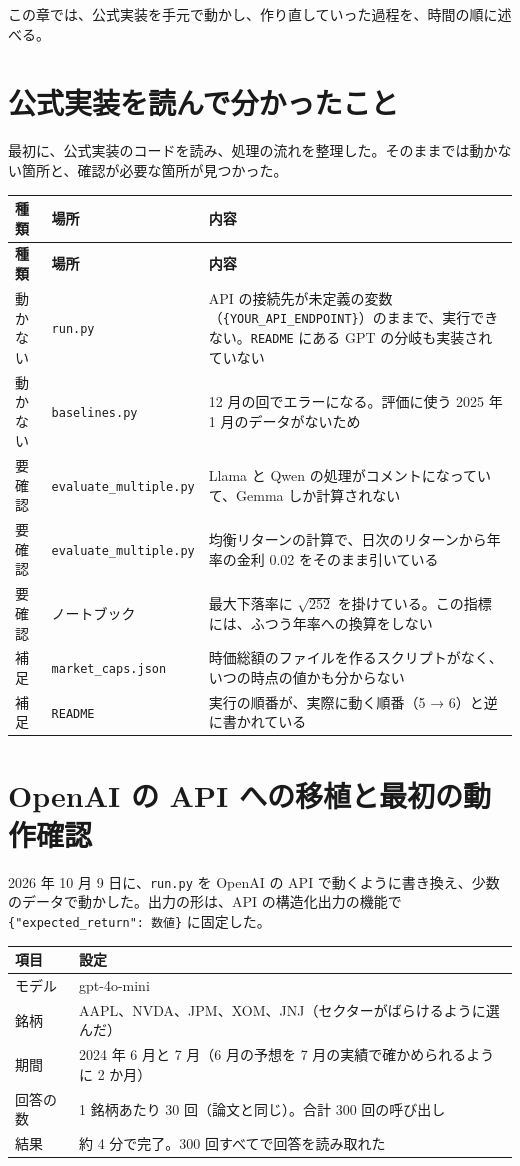 \documentclass[xelatex,ja=standard,jafont=hiragino-pron,a4paper,10pt]{bxjsreport}
\newcommand{\code}[1]{\texttt{#1}}
\begin{document}
この章では、公式実装を手元で動かし、作り直していった過程を、時間の順に述べる。

\section{公式実装を読んで分かったこと}

最初に、公式実装のコードを読み、処理の流れを整理した。そのままでは動かない箇所と、確認が必要な箇所が見つかった。

\begin{longtable}{p{2.00cm}p{4.20cm}p{8.20cm}}
\toprule
\textbf{種類} & \textbf{場所} & \textbf{内容} \\
\midrule
\endfirsthead
\toprule
\textbf{種類} & \textbf{場所} & \textbf{内容} \\
\midrule
\endhead
\bottomrule
\endfoot
動かない & \code{run.py} & API の接続先が未定義の変数（\code{\{YOUR\_API\_ENDPOINT\}}）のままで、実行できない。\code{README} にある GPT の分岐も実装されていない \\
動かない & \code{baselines.py} & 12 月の回でエラーになる。評価に使う 2025 年 1 月のデータがないため \\
要確認 & \code{evaluate\_multiple.py} & Llama と Qwen の処理がコメントになっていて、Gemma しか計算されない \\
要確認 & \code{evaluate\_multiple.py} & 均衡リターンの計算で、日次のリターンから年率の金利 0.02 をそのまま引いている \\
要確認 & ノートブック & 最大下落率に $\sqrt{252}$ を掛けている。この指標には、ふつう年率への換算をしない \\
補足 & \code{market\_caps.json} & 時価総額のファイルを作るスクリプトがなく、いつの時点の値かも分からない \\
補足 & \code{README} & 実行の順番が、実際に動く順番（5 → 6）と逆に書かれている \\
\end{longtable}

\section{OpenAI の API への移植と最初の動作確認}

2026 年 10 月 9 日に、\code{run.py} を OpenAI の API で動くように書き換え、少数のデータで動かした。出力の形は、API の構造化出力の機能で \code{\{"expected\_return": 数値\}} に固定した。

\begin{longtable}{p{3.40cm}p{11.00cm}}
\toprule
\textbf{項目} & \textbf{設定} \\
\midrule
\endfirsthead
\bottomrule
\endfoot
モデル & gpt-4o-mini \\
銘柄 & AAPL、NVDA、JPM、XOM、JNJ（セクターがばらけるように選んだ） \\
期間 & 2024 年 6 月と 7 月（6 月の予想を 7 月の実績で確かめられるように 2 か月） \\
回答の数 & 1 銘柄あたり 30 回（論文と同じ）。合計 300 回の呼び出し \\
結果 & 約 4 分で完了。300 回すべてで回答を読み取れた \\
\end{longtable}
\end{document}

